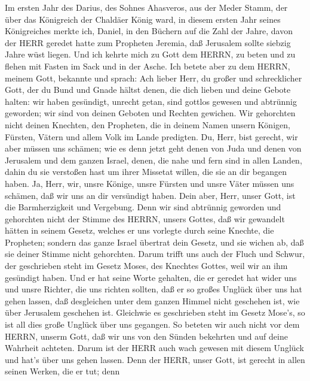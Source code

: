  Im ersten Jahr des Darius, des Sohnes Ahasveros, aus der
Meder Stamm, der über das Königreich der Chaldäer König ward,
 in diesem ersten Jahr seines Königreiches merkte ich,
Daniel, in den Büchern auf die Zahl der Jahre, davon der HERR geredet
hatte zum Propheten Jeremia, daß Jerusalem sollte siebzig Jahre wüst
liegen.  Und ich kehrte mich zu Gott dem HERRN, zu beten und
zu flehen mit Fasten im Sack und in der Asche.  Ich betete
aber zu dem HERRN, meinem Gott, bekannte und sprach: Ach lieber Herr, du
großer und schrecklicher Gott, der du Bund und Gnade hältst denen, die
dich lieben und deine Gebote halten:  wir haben gesündigt,
unrecht getan, sind gottlos gewesen und abtrünnig geworden; wir sind von
deinen Geboten und Rechten gewichen.  Wir gehorchten nicht
deinen Knechten, den Propheten, die in deinem Namen unsern Königen,
Fürsten, Vätern und allem Volk im Lande predigten.  Du,
Herr, bist gerecht, wir aber müssen uns schämen; wie es denn jetzt geht
denen von Juda und denen von Jerusalem und dem ganzen Israel, denen, die
nahe und fern sind in allen Landen, dahin du sie verstoßen hast um ihrer
Missetat willen, die sie an dir begangen haben.  Ja, Herr,
wir, unsre Könige, unsre Fürsten und unsre Väter müssen uns schämen, daß
wir uns an dir versündigt haben.  Dein aber, Herr, unser
Gott, ist die Barmherzigkeit und Vergebung. Denn wir sind abtrünnig
geworden  und gehorchten nicht der Stimme des HERRN, unsers
Gottes, daß wir gewandelt hätten in seinem Gesetz, welches er uns
vorlegte durch seine Knechte, die Propheten;  sondern das
ganze Israel übertrat dein Gesetz, und sie wichen ab, daß sie deiner
Stimme nicht gehorchten. Darum trifft uns auch der Fluch und Schwur, der
geschrieben steht im Gesetz Moses, des Knechtes Gottes, weil wir an ihm
gesündigt haben.  Und er hat seine Worte gehalten, die er
geredet hat wider uns und unsre Richter, die uns richten sollten, daß er
so großes Unglück über uns hat gehen lassen, daß desgleichen unter dem
ganzen Himmel nicht geschehen ist, wie über Jerusalem geschehen ist.
 Gleichwie es geschrieben steht im Gesetz Mose's, so ist
all dies große Unglück über uns gegangen. So beteten wir auch nicht vor
dem HERRN, unserm Gott, daß wir uns von den Sünden bekehrten und auf
deine Wahrheit achteten.  Darum ist der HERR auch wach
gewesen mit diesem Unglück und hat's über uns gehen lassen. Denn der
HERR, unser Gott, ist gerecht in allen seinen Werken, die er tut; denn
